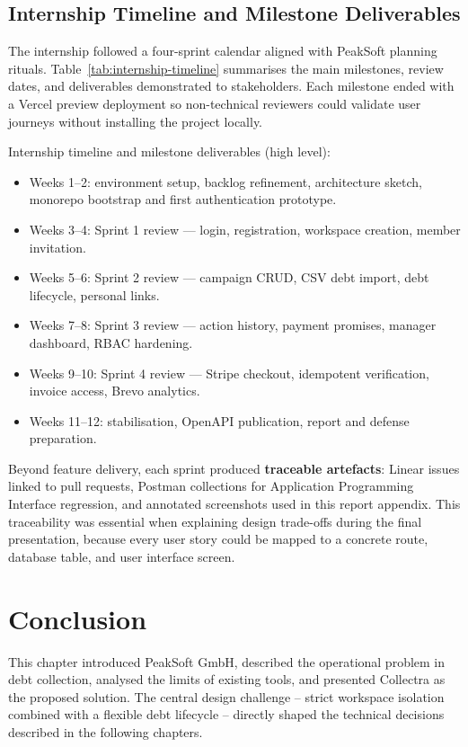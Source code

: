 ﻿\documentclass[12pt,a4paper]{report}
\begin{document}
\subsection{Internship Timeline and Milestone Deliverables}

The internship followed a four-sprint calendar aligned with PeakSoft planning rituals.
Table~\ref{tab:internship-timeline} summarises the main milestones, review dates, and
deliverables demonstrated to stakeholders.
Each milestone ended with a Vercel preview deployment so non-technical reviewers could
validate user journeys without installing the project locally.

\noindent Internship timeline and milestone deliverables (high level):

\begin{itemize}
  \item Weeks 1--2: environment setup, backlog refinement, architecture sketch, monorepo bootstrap and first authentication prototype.
  \item Weeks 3--4: Sprint 1 review — login, registration, workspace creation, member invitation.
  \item Weeks 5--6: Sprint 2 review — campaign CRUD, CSV debt import, debt lifecycle, personal links.
  \item Weeks 7--8: Sprint 3 review — action history, payment promises, manager dashboard, RBAC hardening.
  \item Weeks 9--10: Sprint 4 review — Stripe checkout, idempotent verification, invoice access, Brevo analytics.
  \item Weeks 11--12: stabilisation, OpenAPI publication, report and defense preparation.
\end{itemize}

Beyond feature delivery, each sprint produced \textbf{traceable artefacts}: Linear issues
linked to pull requests, Postman collections for Application Programming Interface regression,
and annotated screenshots used in this report appendix.
This traceability was essential when explaining design trade-offs during the final presentation,
because every user story could be mapped to a concrete route, database table, and user interface screen.

\section*{Conclusion}
{}

This chapter introduced PeakSoft GmbH, described the operational problem in debt
collection, analysed the limits of existing tools, and presented Collectra as the
proposed solution.
The central design challenge -- strict workspace isolation combined with a flexible
debt lifecycle -- directly shaped the technical decisions described in the following
chapters.
\end{document}
